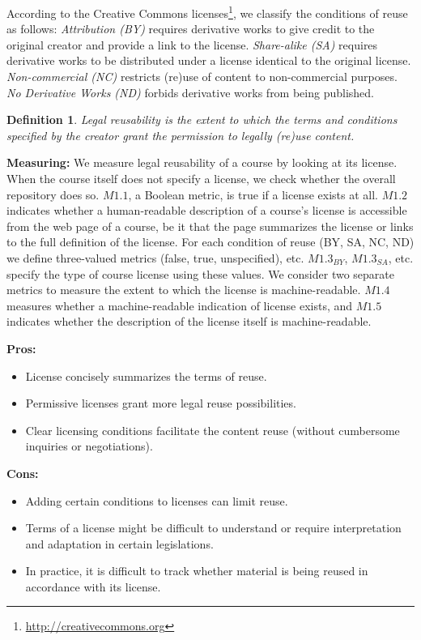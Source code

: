 \documentclass{sig-alternate}
\theoremstyle{definition}
\newtheorem{defn}{Definition}
\begin{document}
According to the Creative Commons licenses\footnote{\url{http://creativecommons.org}}, we classify the conditions of reuse as follows:
\emph{Attribution (BY)} requires derivative works to give credit to the original creator and provide a link to the license.
\emph{Share-alike (SA)} requires derivative works to be distributed under a license identical to the original license.
\emph{Non-commercial (NC)} restricts (re)use of content to non-commercial purposes.
\emph{No Derivative Works (ND)} forbids derivative works from being published.

\begin{defn}
\emph{Legal reusability is the extent to which the terms and conditions specified by the creator grant the permission to legally (re)use content.}
\end{defn}

\noindent\textbf{Measuring:}
We measure legal reusability of a course by looking at its license.
When the course itself does not specify a license, we check whether the overall repository does so.
$M1.1$, a Boolean metric, is true if a license exists at all.
$M1.2$ indicates whether a human-readable description of a course's license is accessible from the web page of a course, be it that the page summarizes the license or links to the full definition of the license.
For each condition of reuse (BY, SA, NC, ND) we define three-valued metrics (false, true, unspecified), etc.
$M1.3_\mathit{BY}$, $M1.3_\mathit{SA}$, etc. specify the type of course license using these values.
We consider two separate metrics to measure the extent to which the license is machine-readable.
$M1.4$ measures whether a machine-readable indication of license exists,
and $M1.5$ indicates whether the description of the license itself is machine-readable.




\noindent\textbf{Pros:}
\begin{itemize}
\item License concisely summarizes the terms of reuse.
\item Permissive licenses grant more legal reuse possibilities.
\item Clear licensing conditions facilitate the content reuse (without cumbersome inquiries or negotiations).
\end{itemize}
\noindent\textbf{Cons:}
\begin{itemize}
\item Adding certain conditions to licenses can limit reuse.
\item Terms of a license might be difficult to understand or require interpretation and adaptation in certain legislations.
\item In practice, it is difficult to track whether material is being reused in accordance with its license.
\end{itemize}
\end{document}
